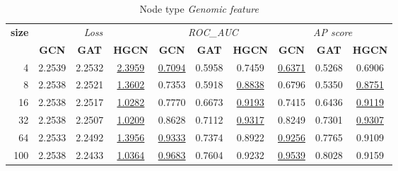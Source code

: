 \begin{table}
    \begin{subtable}[t]{\textwidth}
        \centering
        \begin{tabular}{r|ccc|ccc|ccc}      
            \toprule
            \multirow{2}{*}{\textbf{size}} & \multicolumn{3}{c|}{\textit{Loss}} & \multicolumn{3}{c|}{\textit{ROC\_AUC}} & \multicolumn{3}{c}{\textit{AP score}} \\
            & \textbf{GCN} & \textbf{GAT} & \textbf{HGCN} & \textbf{GCN} & \textbf{GAT} & \textbf{HGCN} & \textbf{GCN} & \textbf{GAT} & \textbf{HGCN} \\
            \midrule
            4 & 2.2539 & 2.2532 & \underline{2.3959} & \underline{0.7094} & 0.5958 & 0.7459 & \underline{0.6371} & 0.5268 & 0.6906 \\
            8 & 2.2538 & 2.2521 & \underline{1.3602} & 0.7353 & 0.5918 & \underline{0.8838} & 0.6796 & 0.5350 & \underline{0.8751} \\
            16 & 2.2538 & 2.2517 & \underline{1.0282} & 0.7770 & 0.6673 & \underline{0.9193} & 0.7415 & 0.6436 & \underline{0.9119} \\
            32 & 2.2538 & 2.2507 & \underline{1.0209} & 0.8628 & 0.7112 & \underline{0.9317} & 0.8249 & 0.7301 & \underline{0.9307} \\
            64 & 2.2533 & 2.2492 & \underline{1.3956} & \underline{0.9333} & 0.7374 & 0.8922 & \underline{0.9256} & 0.7765 & 0.9109 \\
            100 & 2.2538 & 2.2433 & \underline{1.0364} & \underline{0.9683} & 0.7604 & 0.9232 & \underline{0.9539} & 0.8028 & 0.9159 \\
            \bottomrule
        \end{tabular}
        \caption{Node type \textit{Genomic feature}}
    \end{subtable}
    
    \vspace{1em}
    

\end{table}
